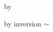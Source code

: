 \begin{lamportproof}
    \begin{pfproof}
      \qedstep
        \begin{pfproof}
          by 
        \end{pfproof}
    \end{pfproof}

    \begin{pfproof}
      \qedstep
        \begin{pfproof}
          by inversion $\sim$
        \end{pfproof}
    \end{pfproof}

\end{lamportproof}

